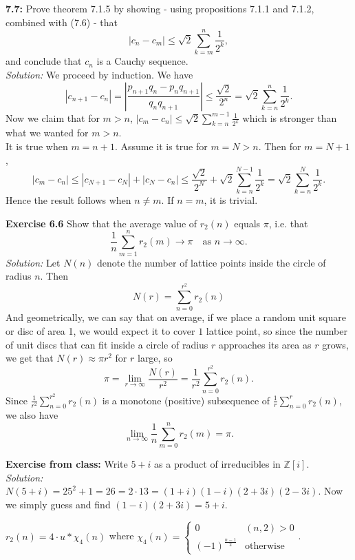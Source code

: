 \documentclass[a4paper]{article}
\begin{document}
\textbf{7.7:} Prove theorem 7.1.5 by showing - using propositions 7.1.1 and
7.1.2, combined with (7.6) - that
\[
\left| c_n - c_m \right| \le \sqrt{2} \sum_{k=m}^{n} \frac{1}{2^{k}},
\] 
and conclude that $c_n$ is a Cauchy sequence.\\
\linebreak
\textit{Solution:}  
We proceed by induction. We have
\[
\left| c_{n+1}-c_n \right| = \left| \frac{p_{n+1}q_n - p_n q_{n+1}}{q_n q_{n+1}} \right| 
\le \frac{\sqrt{2} }{2^{n}} = \sqrt{2} \sum_{k=n}^{n} \frac{1}{2^{k}}.
\] 
Now we claim that for $m>n$, $\left| c_m - c_n \right| \le \sqrt{2} \sum_{k=n}^{m-1}
\frac{1}{2^{k}}$ which is stronger than what we wanted for $m >n$.\\
It is true when $m=n+1$. Assume it is true for $m=N > n$. Then for $m=N+1$,
\[
|c_{m}-c_n| \le \left| c_{N+1} - c_N \right| + \left| c_N - c_n \right| 
\le \frac{\sqrt{2} }{2^{N}} + \sqrt{2}  \sum_{k=n}^{N-1} \frac{1}{2^{k}}
= \sqrt{2}  \sum_{k=n}^{N} \frac{1}{2^{k}}.
\] 
Hence the result follows when $n\neq m$. If $n=m$, it is trivial.


\textbf{Exercise 6.6} Show that the average value of $r_2 (n)$ equals $\pi$,
i.e. that
\[
\frac{1}{n} \sum_{m=1}^{n} r_2 (m) \to \pi \quad \text{as }n \to \infty.
\] 
\textit{Solution:} Let $N(n)$ denote the number of lattice points inside the
circle of radius $n$. Then
 \[
N (r) = \sum_{n=0}^{r^2} r_2(n)
\] 
And geometrically, we can say that on average, if we place a random unit square
or disc of area 1, we would expect it to cover $1$ lattice point, so since the
number of unit discs that can fit inside a circle of radius $r$ approaches its
area as $r$ grows, we get
that $N(r) \approx \pi r^2$ for $r$ large, so
\[
\pi = \lim_{r \to \infty} \frac{N(r)}{r^2} = \frac{1}{r^2} \sum_{n=0}^{r^2} r_2
(n).
\] 
Since $\frac{1}{r^2} \sum_{n=0}^{r^2} r_2(n)$ is a monotone (positive)
subsequence of $\frac{1}{r} \sum_{n=0}^{r} r_2(n)$, we also have
\[
\lim_{n \to \infty} \frac{1}{n} \sum_{m=0}^{n} r_2(m) = \pi.
\] 















\newpage
\textbf{Exercise from class:} Write $5+i$ as a product of irreducibles in
$\mathbb{Z}[i]$.\\
\linebreak
\textit{Solution:} $N(5+i) = 25^2 + 1 = 26 = 2 \cdot 13 = (1+i)(1-i)
(2+3i)(2-3i)$. Now we simply guess and find
$(1-i)(2+3i) = 5+i $.\\
\linebreak









    

$r_2 (n) = 4 \cdot u * \chi_4 (n)$ where
$\chi_4(n) = \begin{cases}
    0 & (n,2)>0\\
    \left( -1 \right)^{\frac{n-1}{2}} & \text{otherwise}
\end{cases}$.
\end{document}
